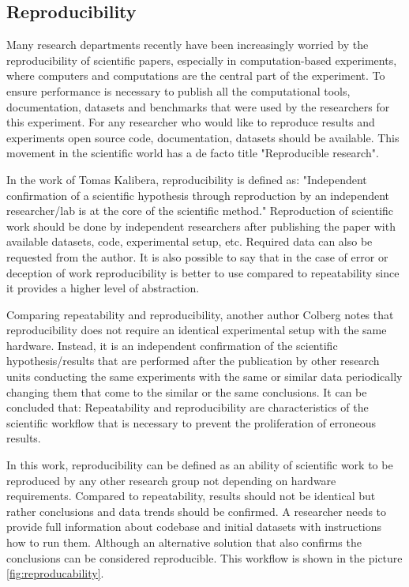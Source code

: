 \documentclass{vldb}
\begin{document}
\subsection{Reproducibility}
Many research departments recently have been increasingly worried by the reproducibility of scientific papers, especially in computation-based experiments, where computers and computations are the central part of the experiment. To ensure performance is necessary to publish all the computational tools, documentation, datasets and benchmarks that were used by the researchers for this experiment. For any researcher who would like to reproduce results and experiments open source code, documentation, datasets should be available. This movement in the scientific world has a de facto title "Reproducible research"\cite{DBLP:journals/jetai/Drummond18}. \par
In the work of Tomas Kalibera\cite{DBLP:conf/popl/Vitek15}, reproducibility is defined as: "Independent confirmation of a scientific hypothesis through reproduction by an independent researcher/lab is at the core of the scientific method." Reproduction of scientific work should be done by independent researchers after publishing the paper with available datasets, code, experimental setup, etc. Required data can also be requested from the author. It is also possible to say that in the case of error or deception of work reproducibility is better to use compared to repeatability since it provides a higher level of abstraction.\par
Comparing repeatability and reproducibility, another author Colberg\cite{DBLP:journals/cacm/CollbergP16} notes that reproducibility does not require an identical experimental setup with the same hardware. Instead, it is an independent confirmation of the scientific hypothesis/results that are performed after the publication by other research units conducting the same experiments with the same or similar data periodically changing them that come to the similar or the same conclusions. It can be concluded that: Repeatability and reproducibility are characteristics of the scientific workflow that is necessary to prevent the proliferation of erroneous results. \par
In this work, reproducibility can be defined as an ability of scientific work to be reproduced by any other research group not depending on hardware requirements. Compared to repeatability, results should not be identical but rather conclusions and data trends should be confirmed. A researcher needs to provide full information about codebase and initial datasets with instructions how to run them. Although an alternative solution that also confirms the conclusions can be considered reproducible. This workflow is shown in the picture \ref{fig:reproducability}.\par
\end{document}
